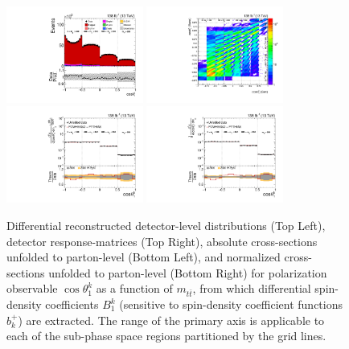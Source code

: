 \clearpage
\begin{figure}[htb]
\begin{center}
 \includegraphics[width=0.40\textwidth]{fig_fullRun2UL/controlplots/combined/Hyp_AntiLeptonBk_vs_TTBarMass.pdf}
 \includegraphics[width=0.40\textwidth]{fig_fullRun2UL/unfolding/combined/ResponseMatrix_b1k_mttbar.pdf} \\
 \includegraphics[width=0.40\textwidth]{fig_fullRun2UL/unfolding/combined/UnfoldedResults_b1k_mttbar.pdf}
 \includegraphics[width=0.40\textwidth]{fig_fullRun2UL/unfolding/combined/UnfoldedResultsNorm_b1k_mttbar.pdf} \\
\label{fig:b1k_mttbar}
\caption{Differential reconstructed detector-level distributions (Top Left), detector response-matrices (Top Right), absolute cross-sections unfolded to parton-level (Bottom Left), and normalized cross-sections unfolded to parton-level (Bottom Right) for polarization observable $\cos\theta_{1}^{k}$ as a function of $m_{t\bar{t}}$, from which differential spin-density coefficients $B_{1}^{k}$ (sensitive to spin-density coefficient functions $b_k^{+}$) are extracted.  The range of the primary axis is applicable to each of the sub-phase space regions partitioned by the grid lines.}
\end{center}
\end{figure}
